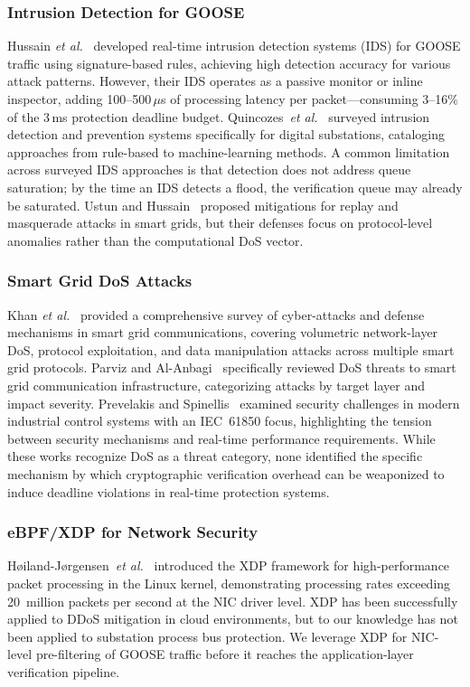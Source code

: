 \documentclass[journal]{IEEEtran}
\begin{document}
\subsubsection{Intrusion Detection for GOOSE}
Hussain \textit{et al.}~\cite{hussain2019goose} developed real-time intrusion detection systems (IDS) for GOOSE traffic using signature-based rules, achieving high detection accuracy for various attack patterns. However, their IDS operates as a passive monitor or inline inspector, adding 100--500\,$\mu$s of processing latency per packet---consuming 3--16\% of the 3\,ms protection deadline budget. Quincozes~\textit{et al.}~\cite{quincozes2021survey} surveyed intrusion detection and prevention systems specifically for digital substations, cataloging approaches from rule-based to machine-learning methods. A common limitation across surveyed IDS approaches is that detection does not address queue saturation; by the time an IDS detects a flood, the verification queue may already be saturated. Ustun and Hussain~\cite{ustun2019novel} proposed mitigations for replay and masquerade attacks in smart grids, but their defenses focus on protocol-level anomalies rather than the computational DoS vector.

\subsubsection{Smart Grid DoS Attacks}
Khan \textit{et al.}~\cite{khan2021survey} provided a comprehensive survey of cyber-attacks and defense mechanisms in smart grid communications, covering volumetric network-layer DoS, protocol exploitation, and data manipulation attacks across multiple smart grid protocols. Parviz and Al-Anbagi~\cite{parviz2022dos} specifically reviewed DoS threats to smart grid communication infrastructure, categorizing attacks by target layer and impact severity. Prevelakis and Spinellis~\cite{prevelakis2018ics} examined security challenges in modern industrial control systems with an IEC~61850 focus, highlighting the tension between security mechanisms and real-time performance requirements. While these works recognize DoS as a threat category, none identified the specific mechanism by which cryptographic verification overhead can be weaponized to induce deadline violations in real-time protection systems.

\subsubsection{eBPF/XDP for Network Security}
H{\o}iland-J{\o}rgensen~\textit{et al.}~\cite{hoevik2015ebpf} introduced the XDP framework for high-performance packet processing in the Linux kernel, demonstrating processing rates exceeding 20~million packets per second at the NIC driver level. XDP has been successfully applied to DDoS mitigation in cloud environments, but to our knowledge has not been applied to substation process bus protection. We leverage XDP for NIC-level pre-filtering of GOOSE traffic before it reaches the application-layer verification pipeline.
\end{document}
